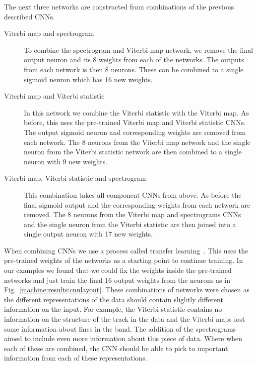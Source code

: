 The next three networks are constructed from combinations of the previous described \glspl{CNN}.

\begin{description}
	\item [Viterbi map and spectrogram] To combine the spectrogram and Viterbi map network, we remove the final output neuron and its 8 weights from each of the networks. 
	The outputs from each network is then 8 neurons. These can be combined to a single sigmoid neuron which has 16 new weights.
	
	\item [Viterbi map and Viterbi statistic] In this network we combine the
	Viterbi statistic with the Viterbi map. As before, this uses the pre-trained
	Viterbi map and Viterbi statistic \glspl{CNN}. The output sigmoid neuron and corresponding weights are removed from each network. 
	The 8 neurons from the Viterbi map network and the single neuron from the Viterbi statistic network are then combined to a single neuron with 9 new weights.
	
	\item [Viterbi map, Viterbi statistic and spectrogram] This combination takes all component \glspl{CNN} from above. As before the final sigmoid output and the corresponding weights from each network are removed.
	The 8 neurons from the Viterbi map and spectrograms \glspl{CNN} and the single neuron from the Viterbi statistic are then joined into a single output neuron with 17 new weights. 
	
\end{description}

When combining \glspl{CNN} we use a process called transfer
learning~\cite{prattDiscriminabilityBasedTransfer}. This uses the pre-trained weights of the networks as a starting point to continue training. 
In our examples we found that we could fix the weights inside the pre-trained networks and just train the final 16 output weights from the neurons as in Fig.~\ref{machine:results:cnnlayout}.
These combinations of networks were chosen as the different representations of the data should contain slightly different information on the input.
For example, the Viterbi statistic contains no information on the structure of the track in the data and the Viterbi maps lost some information about lines in the band.
The addition of the spectrograms aimed to include even more information about this piece of data. 
Where when each of these are combined, the \gls{CNN} should be able to pick to important information from each of these representations.

